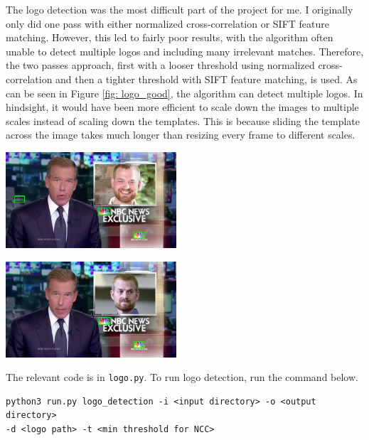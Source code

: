 \documentclass{article}
\begin{document}
The logo detection was the most difficult part of the project for me. I originally only did one pass with either normalized cross-correlation or SIFT feature matching. However, this led to fairly poor results, with the algorithm often unable to detect multiple logos and including many irrelevant matches. Therefore, the two passes approach, first with a looser threshold using normalized cross-correlation and then a tighter threshold with SIFT feature matching, is used. As can be seen in Figure \ref{fig: logo_good}, the algorithm can detect multiple logos. In hindsight, it would have been more efficient to scale down the images to multiple scales instead of scaling down the templates. This is because sliding the template across the image takes much longer than resizing every frame to different scales.

\vspace*{20pt}
\begin{minipage}{0.5\linewidth}
 \label{fig: logo_bad}
\centering
\includegraphics[width=2.5in]{../output/clip_1_logo/104.jpg}
\end{minipage}
\begin{minipage}{0.5\linewidth}
 \label{fig: logo_good}
\centering
\includegraphics[width=2.5in]{../output/clip_1_logo/052.jpg}
\end{minipage}
\vspace*{10pt}

The relevant code is in \texttt{logo.py}. To run logo detection, run the command below.
\begin{verbatim}
python3 run.py logo_detection -i <input directory> -o <output directory>
-d <logo path> -t <min threshold for NCC>
\end{verbatim}
\end{document}
